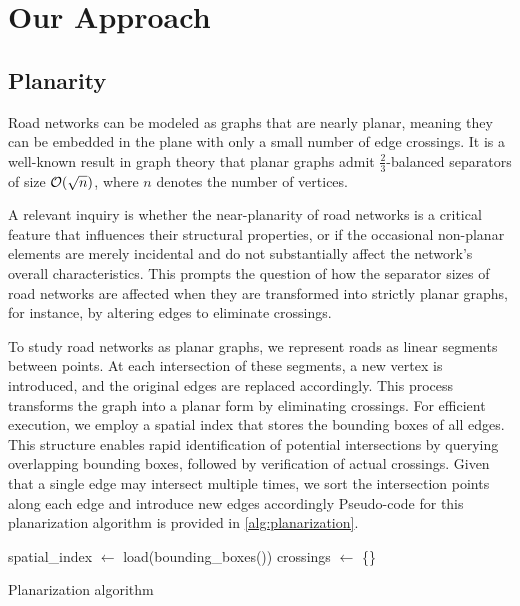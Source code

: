 \chapter{Our Approach} \label{ch:approach}

\section{Planarity} \label{sec:approach:planarity}


Road networks can be modeled as graphs that are nearly planar, meaning they can
be embedded in the plane with only a small number of edge crossings. It is a
well-known result in graph theory that planar graphs admit \(\frac23\)-balanced
separators of size \(\mathcal{O}\!\left(\sqrt{n}\right)\), where \(n\) denotes the number of
vertices. 

A relevant inquiry is whether the near-planarity of road networks is a critical
feature that influences their structural properties, or if the occasional
non-planar elements are merely incidental and do not substantially affect the
network’s overall characteristics. This prompts the question of how the
separator sizes of road networks are affected when they are transformed into
strictly planar graphs, for instance, by altering edges to eliminate crossings.

To study road networks as planar graphs, we represent roads as linear segments
between points. At each intersection of these segments, a new vertex is
introduced, and the original edges are replaced accordingly. This process
transforms the graph into a planar form by eliminating crossings. For efficient
execution, we employ a spatial index that stores the bounding boxes of all
edges. This structure enables rapid identification of potential intersections
by querying overlapping bounding boxes, followed by verification of actual
crossings. Given that a single edge may intersect multiple times, we
sort the intersection points along each edge and introduce new edges
accordingly Pseudo-code for this planarization algorithm is provided in
\cref{alg:planarization}.

\begin{algorithm}[h]
	\BlankLine
	spatial\_index \(\longleftarrow\) load(bounding\_boxes(\E))\;
	crossings \(\longleftarrow\) \{\}\;
	\caption{Planarization algorithm \label{alg:planarization}}
\end{algorithm}

